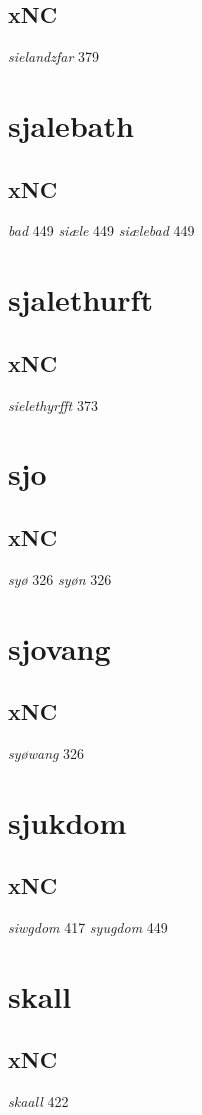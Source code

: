 \documentclass[a4paper,twocolumn]{article}
\begin{document}
\subsection{xNC}
\label{sec:org16c536b}
\emph{sielandzfar} 379 
\section{sjalebath}
\label{sec:orgaa58d79}
\subsection{xNC}
\label{sec:org8057808}
\emph{bad} 449 \emph{siæle} 449 \emph{siælebad} 449 
\section{sjalethurft}
\label{sec:org14fad5e}
\subsection{xNC}
\label{sec:org5c48d52}
\emph{sielethyrfft} 373 
\section{sjo}
\label{sec:orgdce9bc7}
\subsection{xNC}
\label{sec:org4a18299}
\emph{syø} 326 \emph{syøn} 326 
\section{sjovang}
\label{sec:orgfe98a5e}
\subsection{xNC}
\label{sec:org5f03ad3}
\emph{syøwang} 326 
\section{sjukdom}
\label{sec:org6655bf5}
\subsection{xNC}
\label{sec:org5ec5f16}
\emph{siwgdom} 417 \emph{syugdom} 449 
\section{skall}
\label{sec:orgc89d57e}
\subsection{xNC}
\label{sec:orgeea6e6b}
\emph{skaall} 422 
\end{document}
